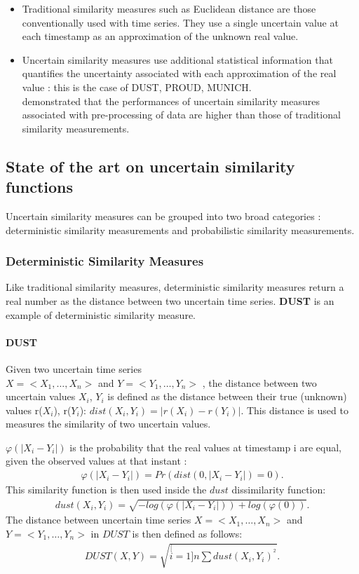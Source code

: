 \begin{itemize}
  \item Traditional similarity measures such as Euclidean distance are those conventionally used with time series. They use a single uncertain value at each timestamp as an approximation of
  the unknown real value.
  \item Uncertain similarity measures use additional statistical information that quantifies the uncertainty associated with each approximation of the real value : this is the case of
  DUST, PROUD, MUNICH\cite{dallachiesa}. \\ \cite{Orang2015} demonstrated that the performances of uncertain similarity measures associated with pre-processing of data are higher than those of traditional similarity measurements.
\end{itemize}


   

\subsection{State of the art on uncertain similarity functions}


Uncertain similarity measures  can be grouped into two broad categories : deterministic similarity measurements and probabilistic similarity measurements.

\subsubsection{Deterministic Similarity Measures} 
Like traditional similarity measures, deterministic  similarity measures  return a real number as the distance between two uncertain time series. \textbf{DUST} is an example of deterministic similarity measure.
\paragraph{DUST}
\cite{murthy2013generalized} Given two uncertain time series \\ $X=<X_1, \ldots,X_n>$ and $Y=<Y_1, \ldots,Y_n>$ , the distance between two uncertain values $X_i$, $Y_i$ is defined as the distance between their true (unknown) values r($X_i$), r($Y_i$): $dist(X_i, Y_i) = |r(X_i) - r(Y_i)|$. This distance is used to measures the similarity of two uncertain values. 

$\varphi(|X_{i}-Y_{i}|)$ is the probability that the real values at timestamp i are equal, given the observed values at that instant :
\begin{eqnarray}
\varphi(|X_{i}-Y_{i}|)=Pr(dist(0, |X_{i}-Y_{i}|)=0).
\end{eqnarray}
This similarity function is then used inside the $dust$ dissimilarity function:
\begin{eqnarray}
dust(X_{i},Y_{i})=\sqrt{-log(\varphi(|X_{i}-Y_{i}|))+log(\varphi(0))}.
\end{eqnarray}
The distance between uncertain time series $X=<X_1, \ldots,X_n>$ and $Y=<Y_1, \ldots,Y_n>$ in $DUST$
is then defined as follows:
\begin{eqnarray}
DUST(X,Y)=\sqrt{\stackrel[i=1]{n}{\sum}dust(X_{i},Y_{i})^{^{2}}}.
\end{eqnarray} 

